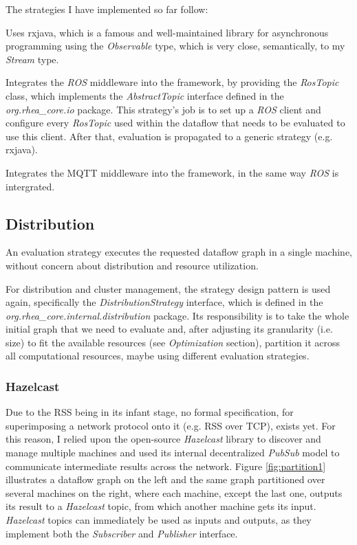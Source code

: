 \documentclass[sigplan,review,anonymous]{acmart}\settopmatter{printfolios=true}
\begin{document}
The strategies I have implemented so far\cite{rhea} follow:

\begin{description}[style=nextline]
\item[RxJavaEvaluationStrategy] 
Uses rxjava, which is a famous and well-maintained library for asynchronous programming using the \textit{Observable} type, which is very close, semantically, to my \textit{Stream} type.

\item[RosEvaluationStrategy] 
Integrates the \textit{ROS} middleware into the framework, by providing the \textit{RosTopic} class, which implements the \textit{AbstractTopic} interface defined in the \textit{org.rhea\_core.io} package. This strategy's job is to set up a \textit{ROS} client and configure every \textit{RosTopic} used within the dataflow that needs to be evaluated to use this client. After that, evaluation is propagated to a generic strategy (e.g. rxjava).

\item[MqttEvaluationStrategy] 
Integrates the MQTT middleware into the framework, in the same way \textit{ROS} is intergrated.
\end{description}

\subsection{Distribution}

An evaluation strategy executes the requested dataflow graph in a single machine, without concern about distribution and resource utilization.

For distribution and cluster management, the strategy design pattern is used again, specifically the \textit{DistributionStrategy} interface, which is defined in the \textit{org.rhea\_core.internal.distribution} package. Its responsibility is to take the whole initial graph that we need to evaluate and, after adjusting its granularity (i.e. size) to fit the available resources (see \textit{Optimization} section), partition it across all computational resources, maybe using different evaluation strategies.

\subsubsection{Hazelcast}

Due to the RSS being in its infant stage, no formal specification, for superimposing a network protocol onto it (e.g. RSS over TCP), exists yet. For this reason, I relied upon the open-source \textit{Hazelcast} library to discover and manage multiple machines and used its internal decentralized \textit{PubSub} model to communicate intermediate results across the network. Figure \ref{fig:partition1} illustrates a dataflow graph on the left and the same graph partitioned over several machines on the right, where each machine, except the last one, outputs its result to a \textit{Hazelcast} topic, from which another machine gets its input. \textit{Hazelcast} topics can immediately be used as inputs and outputs, as they implement both the \textit{Subscriber} and \textit{Publisher} interface.
\end{document}
